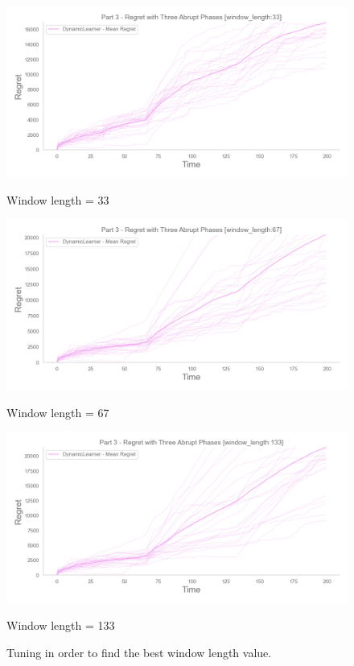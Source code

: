 \begin{figure}[!htb]
    \centering

    \includegraphics[width=\linewidth]{images/win_length33.png}
    \caption{Window length = 33}\label{win33}
    \endminipage\hfill
    \includegraphics[width=\linewidth]{images/win_length67.png}
    \caption{Window length = 67}\label{win67}
    \endminipage\hfill
    \includegraphics[width=\linewidth]{images/win_length133.png}
    \caption{Window length = 133}\label{win133}
    \endminipage\hfill

    \caption{Tuning in order to find the best window length value.}
    \label{winLenValidationFig}
\end{figure}


